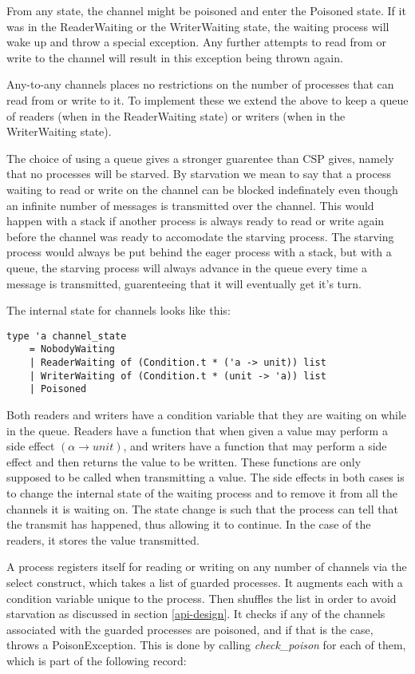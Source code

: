 \documentclass[a4paper,12pt]{article}
\begin{document}
From any state, the channel might be poisoned and enter the Poisoned state. If it was in the
ReaderWaiting or the WriterWaiting state, the waiting process will wake up and throw a special
exception. Any further attempts to read from or write to the channel will result in this 
exception being thrown again.

Any-to-any channels places no restrictions on the number of processes that can
read from or write to it. To implement these we extend the above to keep a queue
of readers (when in the ReaderWaiting state) or writers (when in the
WriterWaiting state).

The choice of using a queue gives a stronger guarentee than CSP gives, namely that no processes
will be starved. By starvation we mean to say that a process waiting to read or write on the
channel can be blocked indefinately even though an infinite number of messages is transmitted
over the channel. This would happen with a stack if another process is always ready to read or 
write again before the channel was ready to accomodate the starving process. The starving process
would always be put behind the eager process with a stack, but with a queue, the starving process
will always advance in the queue every time a message is transmitted, guarenteeing that it will
eventually get it's turn.

\goodbreak
The internal state for channels looks like this:

\begin{verbatim}
type 'a channel_state
    = NobodyWaiting 
    | ReaderWaiting of (Condition.t * ('a -> unit)) list
    | WriterWaiting of (Condition.t * (unit -> 'a)) list
    | Poisoned
\end{verbatim}

Both readers and writers have a condition variable that they are waiting on
while in the queue. Readers have a function that when given a value may perform
a side effect $(\alpha \to unit)$, and writers have a function that may perform
a side effect and then returns the value to be written. These functions are
only supposed to be called when transmitting a value. The side effects in both
cases is to change the internal state of the waiting process and to remove it
from all the channels it is waiting on. The state change is such that the
process can tell that the transmit has happened, thus allowing it to continue.
In the case of the readers, it stores the value transmitted.

A process registers itself for reading or writing on any number of channels via
the select construct, which takes a list of guarded processes. It augments each
with a condition variable unique to the process. Then shuffles the list in order
to avoid starvation as discussed in section \ref{api-design}. It checks if any
of the channels associated with the guarded processes are poisoned, and if
that is the case, throws a PoisonException. This is done by calling
\emph{check\_poison} for each of them, which is part of the following record:
\end{document}
